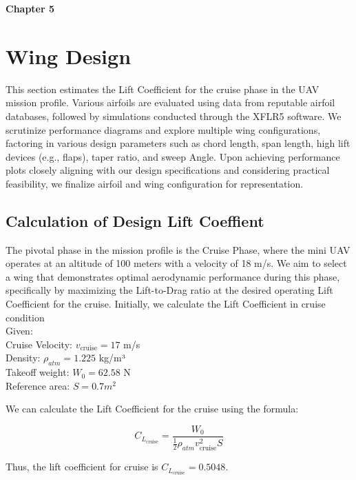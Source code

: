 \documentclass[12 pt]{article}
\begin{document}
\afterpage{\clearpage}
\newpage

\textbf{\Huge{Chapter 5}}
\section{Wing Design}
This section estimates the Lift Coefficient for the cruise phase in the UAV mission profile. Various airfoils are evaluated using data from reputable airfoil databases, followed by simulations conducted through the XFLR5 software. We scrutinize performance diagrams and explore multiple wing configurations, factoring in various design parameters such as chord length, span length, high lift devices (e.g., flaps), taper ratio, and sweep Angle. Upon achieving performance plots closely aligning with our design specifications and considering practical feasibility, we finalize airfoil and wing configuration for representation.
\vspace{5mm} 
 

\color{red}
\subsection{\large Calculation of Design Lift Coeffient}


\color{black}
The pivotal phase in the mission profile is the Cruise Phase, where the mini UAV operates at an altitude of 100 meters with a velocity of 18 m/s. We aim to select a wing that demonstrates optimal aerodynamic performance during this phase, specifically by maximizing the Lift-to-Drag ratio at the desired operating Lift Coefficient for the cruise. Initially, we calculate the Lift Coefficient in cruise condition \\
Given:\\
 Cruise Velocity: \( v_{\text{cruise}} = 17 \) m/s\\
Density: \( \rho_{atm} = 1.225 \) kg/m³\\
 Takeoff weight: \( W_0 = 62.58 \) N\\
 Reference area: \(S = 0.7 m^2\) 

We can calculate the Lift Coefficient for the cruise using the formula:

\[
C_{L_{\text{cruise}}} = \frac{W_0}{\frac{1}{2} \rho_{atm} v_{\text{cruise}}^2 S}    \tag{6.1} \]

Thus, the lift coefficient for cruise is \( C_{L_{\text{cruise}}} = 0.5048 \). 
\color{red}
\end{document}
